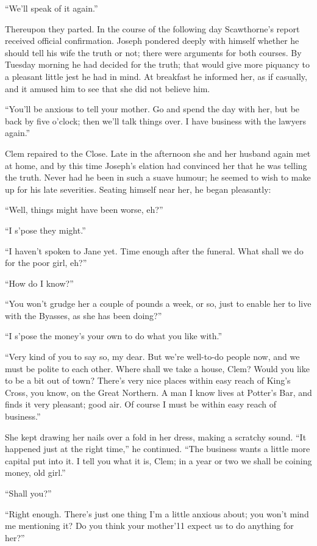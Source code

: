 ``We'll speak of it again.''

Thereupon they parted. In the course of the following day Scawthorne's
report received {}official confirmation. Joseph pondered deeply with
himself whether he should tell his wife the truth or not; there were
arguments for both courses. By Tuesday morning he had decided for the
truth; that would give more piquancy to a pleasant little jest he had in
mind. At breakfast he informed her, as if casually, and it amused him to
see that she did not believe him.

``You'll be anxious to tell your mother. Go and spend the day with her,
but be back by five o'clock; then we'll talk things over. I have
business with the lawyers again.''

Clem repaired to the Close. Late in the afternoon she and her husband
again met at home, and by this time Joseph's elation had convinced her
that he was telling the truth. Never had he been in such a suave humour;
he seemed to wish to make up for his late severities. Seating himself
near her, he began pleasantly:

``Well, things might have been worse, eh?''

``I s'pose they might.''

``I haven't spoken to Jane yet. Time enough after the funeral. What
shall we do for the poor girl, eh?''

{}``How do I know?''

``You won't grudge her a couple of pounds a week, or so, just to enable
her to live with the Byasses, as she has been doing?''

``I s'pose the money's your own to do what you like with.''

``Very kind of you to say so, my dear. But we're well-to-do people now,
and we must be polite to each other. Where shall we take a house, Clem?
Would you like to be a bit out of town? There's very nice places within
easy reach of King's Cross, you know, on the Great Northern. A man I
know lives at Potter's Bar, and finds it very pleasant; good air. Of
course I must be within easy reach of business.''

She kept drawing her nails over a fold in her dress, making a scratchy
sound. ``It happened just at the right time,'' he continued. ``The
business wants a little more capital put into it. I tell you what it is,
Clem; in a year or two we shall be coining money, old girl.''

``Shall you?''

``Right enough. There's just one thing I'm a little anxious about; you
won't mind me {}mentioning it? Do you think your mother'11 expect us to
do anything for her?''

